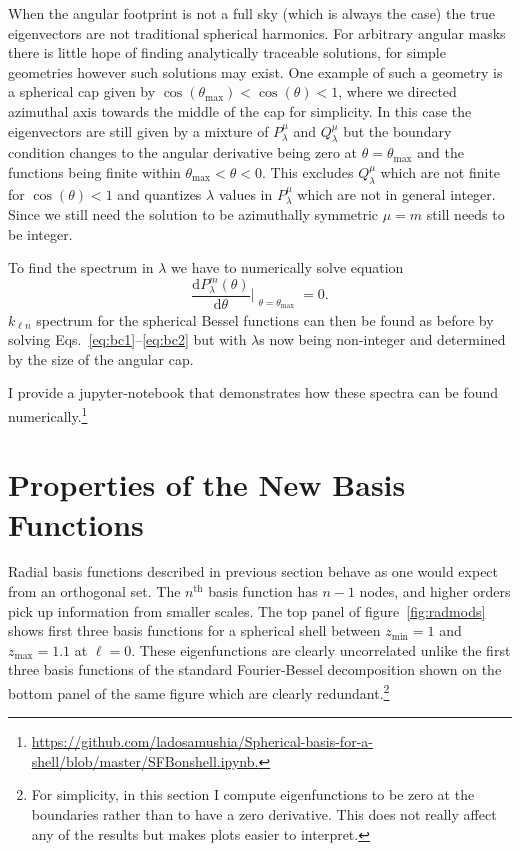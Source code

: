 \documentclass[fleqn,usenatbib]{mnras}
\begin{document}
When the angular footprint is not a full sky (which is always the case) the
true eigenvectors are not traditional spherical harmonics. For arbitrary
angular masks there is little hope of finding analytically traceable solutions,
for simple geometries however such solutions may exist. One example of such a
geometry is a spherical cap given by $\cos(\theta_\mathrm{max}) < \cos(\theta) <
1$, where we directed azimuthal axis towards the middle of the cap for
simplicity. In this case the eigenvectors are still given by a mixture of
$P^\mu_\lambda$ and $Q^\mu_\lambda$ but the boundary condition changes to the angular
derivative being zero at $\theta = \theta_\mathrm{max}$ and the functions being
finite within $\theta_\mathrm{max} < \theta < 0$. This excludes $Q^\mu_\lambda$
which are not finite for $\cos(\theta) < 1$ and quantizes $\lambda$ values in
$P^\mu_\lambda$ which are not in general integer. Since we still need the solution
to be azimuthally symmetric $\mu = m$ still needs to be integer. 

To find the spectrum in $\lambda$ we have to numerically solve equation
\begin{equation}
\frac{\mathrm{d}P^m_\lambda(\theta)}{\mathrm{d}\theta}\Bigr|_{\substack{\theta=\theta_\mathrm{max}}}
= 0.
\end{equation}
\noindent
$k_{\ell n}$ spectrum for the spherical Bessel functions can then be found as
before by solving Eqs.~\eqref{eq:bc1}--\eqref{eq:bc2} but with $\lambda$s now
being non-integer and determined by the size of the angular cap.

I provide a jupyter-notebook that demonstrates how these spectra can be found
numerically.\footnote{\url{https://github.com/ladosamushia/Spherical-basis-for-a-shell/blob/master/SFBonshell.ipynb.}}

\section{Properties of the New Basis Functions}
\label{sec:properties}

Radial basis functions described in previous section behave as one would expect
from an orthogonal set. The $n^\mathrm{th}$ basis function has $n - 1$ nodes,
and higher orders pick up information from smaller scales. The top panel of
figure~\ref{fig:radmods} shows first three basis functions for a spherical
shell between $z_\mathrm{min} = 1$ and $z_\mathrm{max} = 1.1$ at $\ell = 0$.
These eigenfunctions are clearly uncorrelated unlike the first three basis
functions of the standard Fourier-Bessel decomposition shown on the bottom
panel of the same figure which are clearly redundant.\footnote{For simplicity,
in this section I compute eigenfunctions to be zero at the boundaries rather
than to have a zero derivative. This does not really affect any of the results
but makes plots easier to interpret.}
\end{document}
